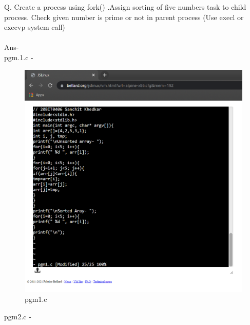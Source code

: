 \documentclass[12pt]{article}
\begin{document}
\setcounter{page}{2}
\pagestyle{fancy}
\fancyhf{}
\rhead{\thepage}
Q. Create a process using fork() .Assign sorting of five numbers task to child process. Check given number is prime or not in parent process  (Use execl or execvp system call)
\\ \\ Ans-
\\ pgm.1.c -
\begin{figure}[h] %
\centering
\includegraphics[width=\textwidth]{pgm1.png}
\caption{pgm1.c}
\end{figure}
\newpage
pgm2.c -
\end{document}
